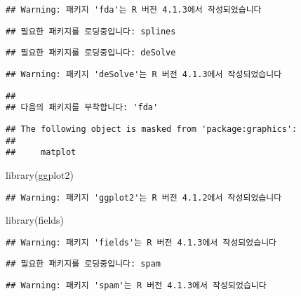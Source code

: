 \documentclass[
]{article}
\newenvironment{Shaded}{\begin{snugshade}}{\end{snugshade}}
\newcommand{\FunctionTok}[1]{\textcolor[rgb]{0.00,0.00,0.00}{#1}}
\newcommand{\NormalTok}[1]{#1}
\begin{document}
\begin{verbatim}
## Warning: 패키지 'fda'는 R 버전 4.1.3에서 작성되었습니다
\end{verbatim}

\begin{verbatim}
## 필요한 패키지를 로딩중입니다: splines
\end{verbatim}

\begin{verbatim}
## 필요한 패키지를 로딩중입니다: deSolve
\end{verbatim}

\begin{verbatim}
## Warning: 패키지 'deSolve'는 R 버전 4.1.3에서 작성되었습니다
\end{verbatim}

\begin{verbatim}
## 
## 다음의 패키지를 부착합니다: 'fda'
\end{verbatim}

\begin{verbatim}
## The following object is masked from 'package:graphics':
## 
##     matplot
\end{verbatim}

\begin{Shaded}
\begin{Highlighting}[]
\FunctionTok{library}\NormalTok{(ggplot2)}
\end{Highlighting}
\end{Shaded}

\begin{verbatim}
## Warning: 패키지 'ggplot2'는 R 버전 4.1.2에서 작성되었습니다
\end{verbatim}

\begin{Shaded}
\begin{Highlighting}[]
\FunctionTok{library}\NormalTok{(fields)}
\end{Highlighting}
\end{Shaded}

\begin{verbatim}
## Warning: 패키지 'fields'는 R 버전 4.1.3에서 작성되었습니다
\end{verbatim}

\begin{verbatim}
## 필요한 패키지를 로딩중입니다: spam
\end{verbatim}

\begin{verbatim}
## Warning: 패키지 'spam'는 R 버전 4.1.3에서 작성되었습니다
\end{verbatim}
\end{document}
